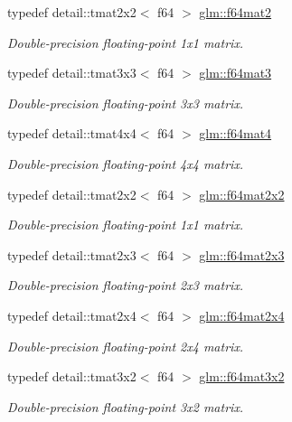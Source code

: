 \begin{DoxyCompactItemize}
typedef detail\-::tmat2x2$<$ f64 $>$ \hyperlink{group__gtc__type__precision_ga9df0911951345cd94f86e7d3895e6941}{glm\-::f64mat2}
\begin{DoxyCompactList}\small\item\em Double-\/precision floating-\/point 1x1 matrix. \end{DoxyCompactList}\item 
typedef detail\-::tmat3x3$<$ f64 $>$ \hyperlink{group__gtc__type__precision_ga1a05ac0a6e87b279e77d877968f391bc}{glm\-::f64mat3}
\begin{DoxyCompactList}\small\item\em Double-\/precision floating-\/point 3x3 matrix. \end{DoxyCompactList}\item 
typedef detail\-::tmat4x4$<$ f64 $>$ \hyperlink{group__gtc__type__precision_ga20a9c8bd28f6eb7ad10574e5f9068145}{glm\-::f64mat4}
\begin{DoxyCompactList}\small\item\em Double-\/precision floating-\/point 4x4 matrix. \end{DoxyCompactList}\item 
typedef detail\-::tmat2x2$<$ f64 $>$ \hyperlink{group__gtc__type__precision_ga5d1ccf7df0dedda7f0c0dd791abf3fd0}{glm\-::f64mat2x2}
\begin{DoxyCompactList}\small\item\em Double-\/precision floating-\/point 1x1 matrix. \end{DoxyCompactList}\item 
typedef detail\-::tmat2x3$<$ f64 $>$ \hyperlink{group__gtc__type__precision_gac2bd82a88b290054fc10cfdba4a62863}{glm\-::f64mat2x3}
\begin{DoxyCompactList}\small\item\em Double-\/precision floating-\/point 2x3 matrix. \end{DoxyCompactList}\item 
typedef detail\-::tmat2x4$<$ f64 $>$ \hyperlink{group__gtc__type__precision_ga33d98da07dc45f5bdd5f1cbb93ad4934}{glm\-::f64mat2x4}
\begin{DoxyCompactList}\small\item\em Double-\/precision floating-\/point 2x4 matrix. \end{DoxyCompactList}\item 
typedef detail\-::tmat3x2$<$ f64 $>$ \hyperlink{group__gtc__type__precision_gaa3edc3353425c0b14b91ebde718d5bd5}{glm\-::f64mat3x2}
\begin{DoxyCompactList}\small\item\em Double-\/precision floating-\/point 3x2 matrix. \end{DoxyCompactList}\item 

\end{DoxyCompactItemize}
